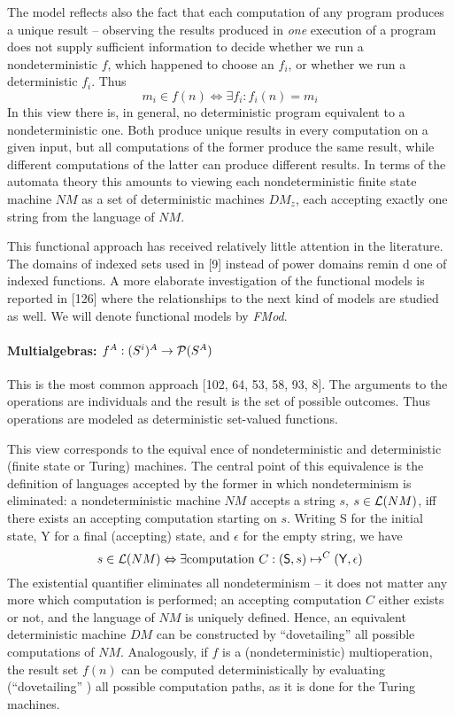 \documentclass[10pt]{article}
\newcommand{\PSet}{{\cal P}}
\renewcommand{\iff}{\mathrel{\Leftrightarrow}}
\newcommand{\into}{\mathrel{\rightarrow}}
\newcommand{\Lang}{{\cal L}}
\newcommand{\rew}{\mathrel{\mapsto}}
\begin{document}
The model reflects also the fact 
that each computation of any program produces a unique result  --  
observing the results produced in {\em one}
 execution of a program does not supply sufficient information to 
decide whether we run a nondeterministic $f$, which happened to 
choose an $f_{i}$, or whether we run a deterministic 
$f_{i}$. Thus  
\[ 
m_{i}\in f(n) \iff \exists f_{i}: f_{i}(n) = m_{i}
\]   %
 In this view there is, in general, 
no deterministic program equivalent to a nondeterministic one. Both 
produce unique results in every computation on a given input, but 
all computations of the former produce the 
same result, while different computations of the latter can produce 
different results. In terms of the automata theory this amounts to 
viewing each nondeterministic finite state machine 
$NM$ as a set of deterministic machines $DM_{z}$, each accepting 
exactly one string from the language of $NM$.

This functional approach has 
received relatively little attention in the literature. The domains 
of indexed sets used in [9] instead of power domains remin
d one of indexed functions. A more elaborate investigation of the 
functional models is reported in [126] where the relationships to the 
next kind of models are studied as well. We will denote functional 
models by {\em FMod}.

\paragraph{ Multialgebras: $f^{A}: (S^{i})^{A}\into \PSet(S^{A})$} 
This is the most common approach [102, 64, 53, 58, 93, 8]. The 
arguments to the operations are individuals and the result is the set 
of possible outcomes. Thus operations are modeled as deterministic 
set-valued functions. 

This view corresponds to the 
equival
ence of nondeterministic and deterministic (finite state or Turing) 
machines. The central point of this equivalence is the definition of 
languages accepted by the former in which nondeterminism is 
eliminated: a nondeterministic machine $NM$ accepts a string 
$s$, $s\in\Lang(NM)$, iff there exists an accepting 
computation starting on $s$. Writing {\sf S} for the initial state, 
{\sf Y} for a final (accepting) state, and $\epsilon$ for the empty 
string, we have
\[
 s\in\Lang(NM) \iff \exists{\rm computation\ }C:({\sf S},s)\rew^{C}({\sf 
 Y},\epsilon)
 \]
The existential quantifier 
eliminates all nondeterminism  --  it does not matter any more 
which computation is performed; an accepting computation $C$
 either exists or not, and the language of $NM$ is uniquely defined. 
Hence, an equivalent deterministic machine $DM$ can be constructed by 
``dovetailing''  all possible computations of $NM$. 
Analogously, if $f$
 is a (nondeterministic) multioperation, the result set $f(n)$ 
 can be computed deterministically by evaluating (``dovetailing'' ) 
 all possible computation paths, as it is done 
for the Turing machines. 
\end{document}
